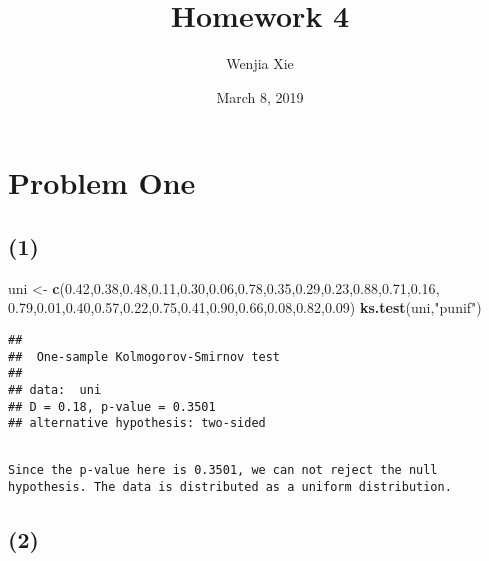 \documentclass[]{article}
\title{Homework 4}
\author{Wenjia Xie}
\date{March 8, 2019}
\newenvironment{Shaded}{\begin{snugshade}}{\end{snugshade}}
\newcommand{\KeywordTok}[1]{\textcolor[rgb]{0.13,0.29,0.53}{\textbf{#1}}}
\newcommand{\FloatTok}[1]{\textcolor[rgb]{0.00,0.00,0.81}{#1}}
\newcommand{\StringTok}[1]{\textcolor[rgb]{0.31,0.60,0.02}{#1}}
\newcommand{\NormalTok}[1]{#1}
\begin{document}
\maketitle

\section{Problem One}\label{problem-one}

\subsection{(1)}\label{section}

\begin{Shaded}
\begin{Highlighting}[]
\NormalTok{uni <-}\StringTok{ }\KeywordTok{c}\NormalTok{(}\FloatTok{0.42}\NormalTok{,}\FloatTok{0.38}\NormalTok{,}\FloatTok{0.48}\NormalTok{,}\FloatTok{0.11}\NormalTok{,}\FloatTok{0.30}\NormalTok{,}\FloatTok{0.06}\NormalTok{,}\FloatTok{0.78}\NormalTok{,}\FloatTok{0.35}\NormalTok{,}\FloatTok{0.29}\NormalTok{,}\FloatTok{0.23}\NormalTok{,}\FloatTok{0.88}\NormalTok{,}\FloatTok{0.71}\NormalTok{,}\FloatTok{0.16}\NormalTok{, }\FloatTok{0.79}\NormalTok{,}\FloatTok{0.01}\NormalTok{,}\FloatTok{0.40}\NormalTok{,}\FloatTok{0.57}\NormalTok{,}\FloatTok{0.22}\NormalTok{,}\FloatTok{0.75}\NormalTok{,}\FloatTok{0.41}\NormalTok{,}\FloatTok{0.90}\NormalTok{,}\FloatTok{0.66}\NormalTok{,}\FloatTok{0.08}\NormalTok{,}\FloatTok{0.82}\NormalTok{,}\FloatTok{0.09}\NormalTok{)}
\KeywordTok{ks.test}\NormalTok{(uni,}\StringTok{"punif"}\NormalTok{)}
\end{Highlighting}
\end{Shaded}

\begin{verbatim}
## 
##  One-sample Kolmogorov-Smirnov test
## 
## data:  uni
## D = 0.18, p-value = 0.3501
## alternative hypothesis: two-sided
\end{verbatim}

\begin{verbatim}
                                                                        Since the p-value here is 0.3501, we can not reject the null hypothesis. The data is distributed as a uniform distribution.                 
\end{verbatim}

\subsection{(2)}\label{section-1}
\end{document}
